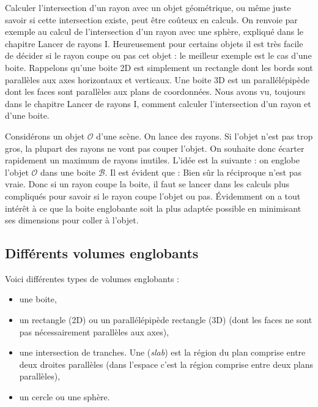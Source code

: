 \documentclass[11pt,class=report,crop=false]{standalone}
\begin{document}
Calculer l'intersection d'un rayon avec un objet géométrique, ou même juste savoir si cette intersection existe, peut être coûteux en calculs. On renvoie par exemple au calcul de l'intersection d'un rayon avec une sphère, expliqué dans le chapitre \og{}Lancer de rayons I\fg{}. Heureusement pour certains objets il est très facile de décider si le rayon coupe ou pas cet objet : le meilleur exemple est le cas d'une boite.
Rappelons qu'une boite 2D est simplement un rectangle dont les bords sont parallèles aux axes horizontaux et verticaux. Une boite 3D est un parallélépipède dont les faces sont parallèles aux plans de coordonnées. Nous avons vu, toujours dans le chapitre \og{}Lancer de rayons I\fg{}, comment calculer l'intersection d'un rayon et d'une boite.

\begin{minipage}{0.45\textwidth}
\end{minipage}
\begin{minipage}{0.45\textwidth}
\end{minipage}

Considérons un objet $\mathcal{O}$ d'une scène. On lance des rayons. Si l'objet n'est pas trop gros, la plupart des rayons ne vont pas couper l'objet. On souhaite donc écarter rapidement un maximum de rayons inutiles. L'idée est la suivante : on englobe l'objet $\mathcal{O}$ dans une boite $\mathcal{B}$. Il est évident que :
Bien sûr la réciproque n'est pas vraie. Donc si un rayon coupe la boite, il faut se lancer dans les calculs plus compliqués pour savoir si le rayon coupe l'objet ou pas. Évidemment on a tout intérêt à ce que la boite englobante soit la plus adaptée possible en minimisant ses dimensions pour \og{}coller\fg{} à l'objet.





\subsection{Différents volumes englobants}

Voici différentes types de volumes englobants :
\begin{itemize}
	\item une boite,
	\item un rectangle (2D) ou un parallélépipède rectangle (3D) (dont les faces ne sont pas nécessairement parallèles aux axes),
	\item une intersection de tranches. Une  (\emph{slab}) est la région du plan comprise entre deux droites parallèles (dans l'espace c'est la région comprise entre deux plans parallèles),
	\item un cercle ou une sphère.
\end{itemize}
\end{document}
